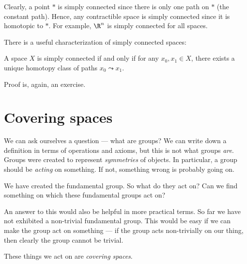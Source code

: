 \documentclass[a4paper]{article}
\begin{document}
\begin{eg}
  Clearly, a point $*$ is simply connected since there is only one path on $*$ (the constant path). Hence, any contractible space is simply connected since it is homotopic to $*$. For example, $\R^n$ is simply connected for all spaces.
\end{eg}

There is a useful characterization of simply connected spaces:
\begin{lemma}
  A space $X$ is simply connected if and only if for any $x_0, x_1\in X$, there exists a unique homotopy class of paths $x_0 \leadsto x_1$.
\end{lemma}

Proof is, again, an exercise.

\section{Covering spaces}
We can ask ourselves a question --- what are groups? We can write down a definition in terms of operations and axioms, but this is not what groups \emph{are}. Groups were created to represent \emph{symmetries} of objects. In particular, a group should be \emph{acting} on something. If not, something wrong is probably going on.

We have created the fundamental group. So what do they act on? Can we find something on which these fundamental groups act on?

An answer to this would also be helpful in more practical terms. So far we have not exhibited a non-trivial fundamental group. This would be easy if we can make the group act on something --- if the group acts non-trivially on our thing, then clearly the group cannot be trivial.

These things we act on are \emph{covering spaces}.
\end{document}

